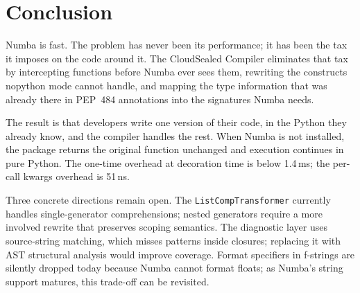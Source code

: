 \documentclass[journal]{IEEEtran}
\begin{document}
\section{Conclusion}

Numba is fast. The problem has never been its performance; it has been the
tax it imposes on the code around it. The CloudSealed Compiler eliminates
that tax by intercepting functions before Numba ever sees them, rewriting
the constructs nopython mode cannot handle, and mapping the type information
that was already there in PEP~484 annotations into the signatures Numba needs.

The result is that developers write one version of their code, in the Python
they already know, and the compiler handles the rest. When Numba is not
installed, the package returns the original function unchanged and execution
continues in pure Python. The one-time overhead at decoration time is below
1.4\,ms; the per-call kwargs overhead is 51\,ns.

Three concrete directions remain open. The \texttt{ListCompTransformer}
currently handles single-generator comprehensions; nested generators require
a more involved rewrite that preserves scoping semantics. The diagnostic layer
uses source-string matching, which misses patterns inside closures; replacing
it with AST structural analysis would improve coverage. Format specifiers in
f-strings are silently dropped today because Numba cannot format floats; as
Numba's string support matures, this trade-off can be revisited.
\end{document}
